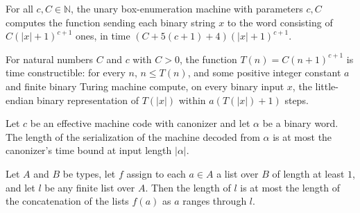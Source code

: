 \begin{lemma}
\label{Complexity.poly_unary_computes}
\leanok
{}
For all $c,C\in\mathbb{N}$, the unary box-enumeration machine with parameters $c,C$
computes the function sending each binary string $x$ to the word consisting of
$C(|x|+1)^{c+1}$ ones, in time $(C+5(c+1)+4)(|x|+1)^{c+1}$.
\end{lemma}

\begin{theorem}
\label{Complexity.timeConstructible_poly}
\leanok
{}
For natural numbers $C$ and $c$ with $C>0$, the function $T(n)=C(n+1)^{c+1}$ is time
constructible: for every $n$, $n\le T(n)$, and some positive integer constant $a$ and
finite binary Turing machine compute, on every binary input $x$, the little-endian
binary representation of $T(|x|)$ within $a(T(|x|)+1)$ steps.
\end{theorem}

\begin{lemma}
\label{Complexity.tmsat_serialization_length}
\leanok
{}
Let $c$ be an effective machine code with canonizer and let $\alpha$ be a binary word.
The length of the serialization of the machine decoded from $\alpha$ is at most the
canonizer's time bound at input length $|\alpha|$.
\end{lemma}

\begin{lemma}
\label{Complexity.tmsat_flatMap_length}
\leanok
{}
Let $A$ and $B$ be types, let $f$ assign to each $a\in A$ a list over $B$ of length at
least $1$, and let $l$ be any finite list over $A$. Then the length of $l$ is at most
the length of the concatenation of the lists $f(a)$ as $a$ ranges through $l$.
\end{lemma}

